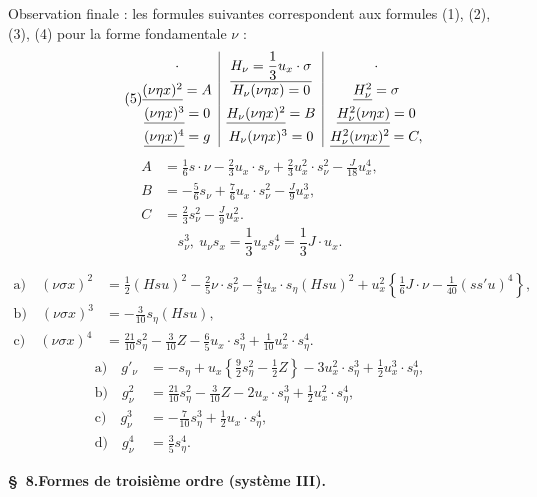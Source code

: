 \documentclass[11pt]{article}
\begin{document}
Observation finale : les formules suivantes correspondent aux formules (1), (2), (3), (4) pour la forme fondamentale $\nu$ :
\[
\tag{5}
\begin{array}{@{}c|c|c@{}}
\cdot & \underline{H_\nu=\dfrac13u_x\cdot\sigma} & \cdot\\[0.45em]
\underline{(\nu\eta x)^2}=A & H_\nu(\nu\eta x)=0 & \underline{H_\nu^2}=\sigma\\[0.45em]
\underline{(\nu\eta x)^3}=0 & \underline{H_\nu(\nu\eta x)^2}=B & \underline{H_\nu^2(\nu\eta x)}=0\\[0.45em]
\underline{(\nu\eta x)^4}=g & H_\nu(\nu\eta x)^3=0 & \underline{H_\nu^2(\nu\eta x)^2}=C,
\end{array}
\]
\[
\begin{aligned}
A&=\frac16s\cdot\nu-\frac23u_x\cdot s_\nu+\frac23u_x^2\cdot s_\nu^2-\frac{J}{18}u_x^4,\\
B&=-\frac56s_\nu+\frac76u_x\cdot s_\nu^2-\frac{J}{9}u_x^3,\\
C&=\frac23s_\nu^2-\frac{J}{9}u_x^2.
\end{aligned}
\]
\[
\tag{6}
s_\nu^3,\ u_\nu s_x=\frac13u_xs_\nu^4=\frac13J\cdot u_x.
\]

\[
\tag{7}
\begin{aligned}
\text{a)}\quad (\nu\sigma x)^2
&=\frac12(Hsu)^2-\frac25\nu\cdot s_\nu^2-
\frac45u_x\cdot s_\eta(Hsu)^2
+u_x^2\left\{\frac16J\cdot\nu-\frac1{40}(ss'u)^4\right\},\\
\text{b)}\quad (\nu\sigma x)^3&=-\frac3{10}s_\eta(Hsu),\\
\text{c)}\quad (\nu\sigma x)^4&=\frac{21}{10}s_\eta^2-\frac3{10}Z-
\frac65u_x\cdot s_\eta^3+\frac1{10}u_x^2\cdot s_\eta^4.
\end{aligned}
\]
\[
\tag{8}
\begin{aligned}
\text{a)}\quad g'_\nu&=-s_\eta+u_x\left\{\frac92s_\eta^2-\frac12Z\right\}-3u_x^2\cdot s_\eta^3+\frac12u_x^3\cdot s_\eta^4,\\
\text{b)}\quad g_\nu^2&=\frac{21}{10}s_\eta^2-\frac3{10}Z-2u_x\cdot s_\eta^3+\frac12u_x^2\cdot s_\eta^4,\\
\text{c)}\quad g_\nu^3&=-\frac7{10}s_\eta^3+\frac12u_x\cdot s_\eta^4,\\
\text{d)}\quad g_\nu^4&=\frac35s_\eta^4.
\end{aligned}
\]

\begin{center}
\textbf{\S\ 8.\quad Formes de troisième ordre (système III).}
\end{center}
\end{document}

